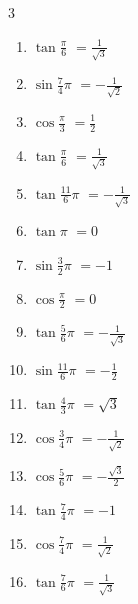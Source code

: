 \begin{multicols}{3}
\begin{enumerate}
  \item $\displaystyle \tan{\frac{\pi}{6}}$
        $\displaystyle =\frac{1}{\sqrt{3}}$

  \item $\displaystyle \sin{\frac{7}{4}\pi}$
        $\displaystyle =-\frac{1}{\sqrt{2}}$

  \item $\displaystyle \cos{\frac{\pi}{3}}$
        $\displaystyle =\frac{1}{2}$

  \item $\displaystyle \tan{\frac{\pi}{6}}$
        $\displaystyle =\frac{1}{\sqrt{3}}$

  \item $\displaystyle \tan{\frac{11}{6}\pi}$
        $\displaystyle =-\frac{1}{\sqrt{3}}$

  \item $\displaystyle \tan{\pi}$
        $\displaystyle =0$

  \item $\displaystyle \sin{\frac{3}{2}\pi}$
        $\displaystyle =-1$

  \item $\displaystyle \cos{\frac{\pi}{2}}$
        $\displaystyle =0$

  \item $\displaystyle \tan{\frac{5}{6}\pi}$
        $\displaystyle =-\frac{1}{\sqrt{3}}$

  \item $\displaystyle \sin{\frac{11}{6}\pi}$
        $\displaystyle =-\frac{1}{2}$

  \item $\displaystyle \tan{\frac{4}{3}\pi}$
        $\displaystyle =\sqrt{3}$

  \item $\displaystyle \cos{\frac{3}{4}\pi}$
        $\displaystyle =-\frac{1}{\sqrt{2}}$

  \item $\displaystyle \cos{\frac{5}{6}\pi}$
        $\displaystyle =-\frac{\sqrt{3}}{2}$

  \item $\displaystyle \tan{\frac{7}{4}\pi}$
        $\displaystyle =-1$

  \item $\displaystyle \cos{\frac{7}{4}\pi}$
        $\displaystyle =\frac{1}{\sqrt{2}}$

  \item $\displaystyle \tan{\frac{7}{6}\pi}$
        $\displaystyle =\frac{1}{\sqrt{3}}$


\end{enumerate}
\end{multicols}
